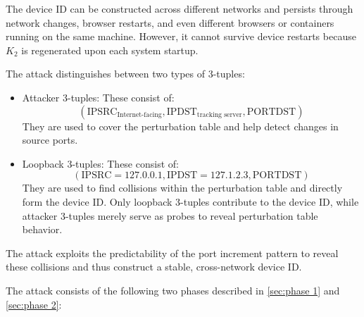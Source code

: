 \documentclass{report}
\begin{document}
The device ID can be constructed across different networks and persists through network changes, browser restarts, and even different browsers or containers running on the same machine. However, it cannot survive device restarts because $K_2$ is regenerated upon each system startup.

The attack distinguishes between two types of 3-tuples:

\begin{itemize}
    \item \alert{Attacker 3-tuples:} These consist of:
    \begin{equation*}
    (\mathrm{IPSRC}_{\text{Internet-facing}}, \mathrm{IPDST}_{\text{tracking server}}, \mathrm{PORTDST})
    \end{equation*}
    They are used to cover the perturbation table and help detect changes in source ports.

    \item \alert{Loopback 3-tuples:} These consist of:
    \begin{equation*}
    (\mathrm{IPSRC} = 127.0.0.1, \mathrm{IPDST} = 127.1.2.3, \mathrm{PORTDST})
    \end{equation*}
    They are used to find collisions within the perturbation table and directly form the device ID. Only loopback 3-tuples contribute to the device ID, while attacker 3-tuples merely serve as probes to reveal perturbation table behavior.
\end{itemize}

The attack exploits the predictability of the port increment pattern to reveal these collisions and thus construct a stable, cross-network device ID.

The attack consists of the following two phases described in \ref{sec:phase 1} and \ref{sec:phase 2}:

%
\end{document}
